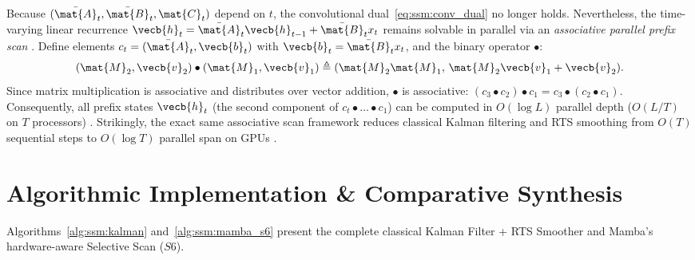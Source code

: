 \documentclass[../../../../master.tex]{subfiles}
\begin{document}
\begin{coremath}
Because $(\bar{\mat{A}}_t, \bar{\mat{B}}_t, \mat{C}_t)$ depend on $t$, the convolutional dual~\eqref{eq:ssm:conv_dual} no longer holds. Nevertheless, the time-varying linear recurrence $\vecb{h}_t = \bar{\mat{A}}_t \vecb{h}_{t-1} + \bar{\mat{B}}_t x_t$ remains solvable in parallel via an \emph{associative parallel prefix scan} . Define elements $c_t = (\bar{\mat{A}}_t, \vecb{b}_t)$ with $\vecb{b}_t = \bar{\mat{B}}_t x_t$, and the binary operator $\bullet$:
\begin{equation}\label{eq:ssm:assoc_op}
  (\mat{M}_2, \vecb{v}_2) \bullet (\mat{M}_1, \vecb{v}_1) \triangleq (\mat{M}_2 \mat{M}_1,\, \mat{M}_2 \vecb{v}_1 + \vecb{v}_2).
\end{equation}
Since matrix multiplication is associative and distributes over vector addition, $\bullet$ is associative: $(c_3 \bullet c_2) \bullet c_1 = c_3 \bullet (c_2 \bullet c_1)$. Consequently, all prefix states $\vecb{h}_t$ (the second component of $c_t \bullet \dots \bullet c_1$) can be computed in $O(\log L)$ parallel depth ($O(L/T)$ on $T$ processors) . Strikingly, the exact same associative scan framework reduces classical Kalman filtering and RTS smoothing from $O(T)$ sequential steps to $O(\log T)$ parallel span on GPUs .
\end{coremath}

\section{Algorithmic Implementation \& Comparative Synthesis}\label{sec:ssm:algorithms}

Algorithms~\ref{alg:ssm:kalman} and~\ref{alg:ssm:mamba_s6} present the complete classical Kalman Filter + RTS Smoother and Mamba's hardware-aware Selective Scan ($S6$).
\end{document}
